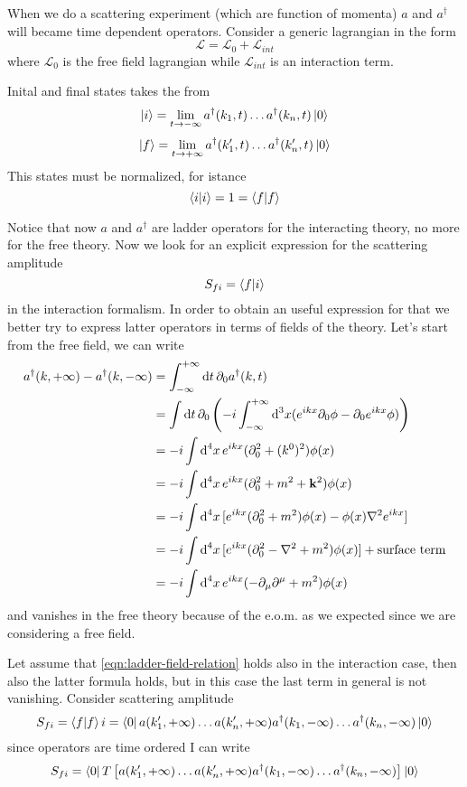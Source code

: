 \documentclass[../main/main.tex]{subfiles}
\begin{document}
When we do a scattering experiment (which are function of momenta) $a$ and $a^\dagger$ will became time dependent operators. Consider a generic lagrangian in the form
\[\mathcal L=\mathcal L_0+\mathcal L_{int}\]
where $\mathcal L_0$ is the free field lagrangian while $\mathcal L_{int}$ is an interaction term.

Inital and final states takes the from
\[\ket i=\lim_{t\rightarrow -\infty}a^\dagger(k_1,t)\dots a^\dagger(k_n,t)\ket0\]
\[\ket f=\lim_{t\rightarrow +\infty}a^\dagger(k_1',t)\dots a^\dagger(k'_n,t)\ket0\]
This states must be normalized, for istance
\[\braket i=1=\braket f\]

Notice that now $a$ and $a^\dagger$ are ladder operators for the interacting theory, no more for the free theory. Now we look for an explicit expression for the scattering amplitude
\[S_{fi}=\braket {f}{i}\]
in the interaction formalism.
In order to obtain an useful expression for that we better try to express latter operators in terms of fields of the theory.
Let's start from the free field, we can write
\begin{equation}\label{eqn:ladder-inf-diff}\begin{split}
a^\dagger(k,+\infty)-a^\dagger(k, -\infty)
&=\int_{-\infty}^{+\infty}\de t\,\partial_0a^\dagger(k,t)\\
&=\int\de t\,\partial_0\left(-i\int_{-\infty}^{+\infty}\de^3x(e^{ikx}\partial_0\phi-\partial_0e^{ikx}\phi)\right)\\
&=-i\int\de^4x\,e^{ikx}(\partial_0^2+(k^0)^2)\phi(x)\\
&=-i\int\de^4x\,e^{ikx}(\partial_0^2+m^2+\vec k^2)\phi(x)\\
&=-i\int\de^4x\,[e^{ikx}(\partial_0^2+m^2)\phi(x)-\phi(x)\vect{\nabla}^2e^{ikx}]\\
&=-i\int\de^4x\,[e^{ikx}(\partial_0^2-\vect{\nabla}^2+m^2)\phi(x)] + \text{surface term}\\
&=-i\int\de^4x\,e^{ikx}(-\partial_\mu\partial^\mu+m^2)\phi(x)
\end{split}\end{equation}
and vanishes in the free theory because of the e.o.m. as we expected since we are considering a free field.

Let assume that \eqref{eqn:ladder-field-relation} holds also in the interaction case, then also the latter formula holds, but in this case the last term in general is not vanishing. 
Consider scattering amplitude
\[S_{fi}=\braket fi=\bra0a(k_1',+\infty)\dots a(k'_n,+\infty)a^\dagger(k_1,-\infty)\dots a^\dagger(k_n,-\infty)\ket0
\]
since operators are time ordered I can write
\[S_{fi}=\bra0T\left[a(k_1',+\infty)\dots a(k'_n,+\infty)a^\dagger(k_1,-\infty)\dots a^\dagger(k_n,-\infty)\right]\ket0
\]
\end{document}
